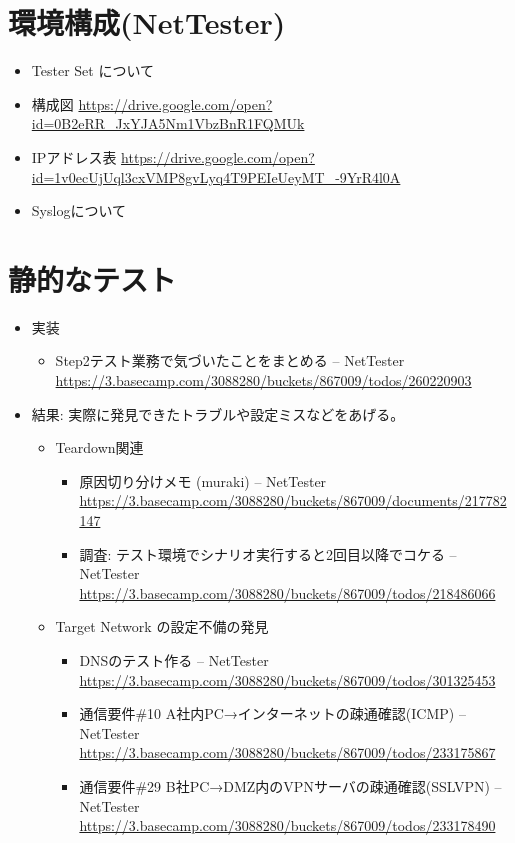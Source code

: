 \section{環境構成(NetTester)}

\begin{itemize}
 \item Tester Set について
 \item 構成図 \url{https://drive.google.com/open?id=0B2eRR_JxYJA5Nm1VbzBnR1FQMUk}
 \item IPアドレス表 \url{https://drive.google.com/open?id=1v0ecUjUql3cxVMP8gvLyq4T9PEIeUeyMT_-9YrR4l0A}
 \item Syslogについて
\end{itemize}

\section{静的なテスト}


\begin{itemize}
 \item 実装
       \begin{itemize}
        \item Step2テスト業務で気づいたことをまとめる – NetTester \url{https://3.basecamp.com/3088280/buckets/867009/todos/260220903}
       \end{itemize}
 \item 結果: 実際に発見できたトラブルや設定ミスなどをあげる。

       \begin{itemize}
        \item Teardown関連
              \begin{itemize}
               \item 原因切り分けメモ (muraki) – NetTester \url{https://3.basecamp.com/3088280/buckets/867009/documents/217782147}
               \item 調査: テスト環境でシナリオ実行すると2回目以降でコケる – NetTester \url{https://3.basecamp.com/3088280/buckets/867009/todos/218486066}
              \end{itemize}
        \item Target Network の設定不備の発見
              \begin{itemize}
               \item DNSのテスト作る – NetTester \url{https://3.basecamp.com/3088280/buckets/867009/todos/301325453}
               \item 通信要件\#10 A社内PC→インターネットの疎通確認(ICMP) – NetTester \url{https://3.basecamp.com/3088280/buckets/867009/todos/233175867}
               \item 通信要件\#29 B社PC→DMZ内のVPNサーバの疎通確認(SSLVPN) – NetTester \url{https://3.basecamp.com/3088280/buckets/867009/todos/233178490}
              \end{itemize}
       \end{itemize}
\end{itemize}

